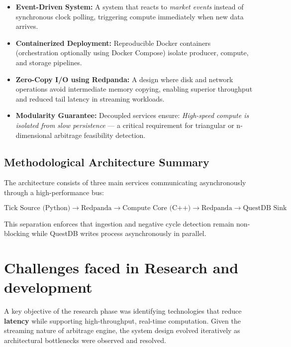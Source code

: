 \documentclass[letterpaper,11pt]{report}
\begin{document}
\begin{itemize}
    \item \textbf{Event-Driven System:}  
    A system that reacts to \emph{market events} instead of synchronous clock polling, triggering compute immediately when new data arrives.

    \item \textbf{Containerized Deployment:}  
    Reproducible Docker containers (orchestration optionally using Docker Compose) isolate producer, compute, and storage pipelines.

    \item \textbf{Zero-Copy I/O using Redpanda:}  
    A design where disk and network operations avoid intermediate memory copying, enabling superior throughput and reduced tail latency in streaming workloads.

    \item \textbf{Modularity Guarantee:}  
    Decoupled services ensure:  
    \emph{High-speed compute is isolated from slow persistence} — a critical requirement for triangular or n-dimensional arbitrage feasibility detection.
\end{itemize}


\section{Methodological Architecture Summary}

The architecture consists of three main services communicating asynchronously through a high-performance bus:

\begin{equation}
\text{Tick~Source (Python)} \rightarrow \text{Redpanda} \rightarrow \text{Compute~Core~(C++)} \rightarrow \text{Redpanda} \rightarrow \text{QuestDB~Sink}
\end{equation}

This separation enforces that ingestion and negative cycle detection remain non-blocking while QuestDB writes process asynchronously in parallel.

\chapter{Challenges faced in Research and development}

A key objective of the research phase was identifying technologies that reduce \textbf{latency} while supporting high-throughput, real-time computation. 
Given the streaming nature of arbitrage engine, the system design evolved iteratively as architectural bottlenecks were observed and resolved.
\end{document}

